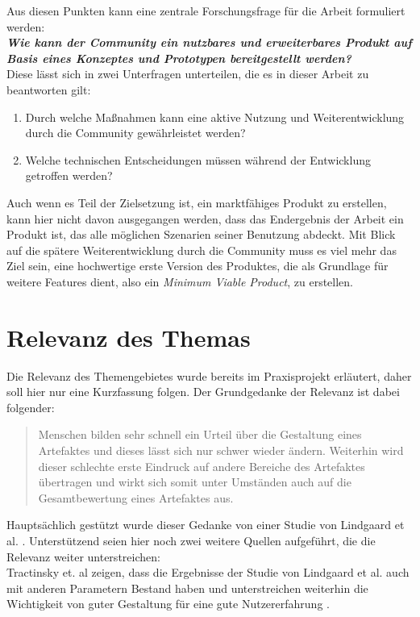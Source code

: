 
Aus diesen Punkten kann eine zentrale Forschungsfrage für die Arbeit formuliert werden:\\

\textit{\textbf{Wie kann der Community ein nutzbares und erweiterbares Produkt auf Basis eines Konzeptes und Prototypen bereitgestellt werden?}}\\

Diese lässt sich in zwei Unterfragen unterteilen, die es in dieser Arbeit zu beantworten gilt:
\begin{enumerate}
  \item Durch welche Maßnahmen kann eine aktive Nutzung und Weiterentwicklung durch die Community gewährleistet werden?
  \item Welche technischen Entscheidungen müssen während der Entwicklung getroffen werden?
\end{enumerate}

Auch wenn es Teil der Zielsetzung ist, ein marktfähiges Produkt zu erstellen, kann hier nicht davon ausgegangen werden, dass das Endergebnis der Arbeit ein Produkt ist, das alle möglichen Szenarien seiner Benutzung abdeckt. Mit Blick auf die spätere Weiterentwicklung durch die Community muss es viel mehr das Ziel sein, eine hochwertige erste Version des Produktes, die als Grundlage für weitere Features dient, also ein \textit{Minimum Viable Product}, zu erstellen.


\section{Relevanz des Themas}
\label{sec:relevance}
Die Relevanz des Themengebietes wurde bereits im Praxisprojekt erläutert, daher soll hier nur eine Kurzfassung folgen. Der Grundgedanke der Relevanz ist dabei folgender:

\begin{quote}
  Menschen bilden sehr schnell ein Urteil über die Gestaltung eines Artefaktes und dieses lässt sich nur schwer wieder ändern. Weiterhin wird dieser schlechte erste Eindruck auf andere Bereiche des Artefaktes übertragen und wirkt sich somit unter Umständen auch auf die Gesamtbewertung eines Artefaktes aus. \cite{PoplawskiPP}
\end{quote}

Hauptsächlich gestützt wurde dieser Gedanke von einer Studie von Lindgaard et al. \cite{lindgaard2006attention}. Unterstützend seien hier noch zwei weitere Quellen aufgeführt, die die Relevanz weiter unterstreichen:\\
Tractinsky et. al zeigen, dass die Ergebnisse der Studie von Lindgaard et al. auch mit anderen Parametern Bestand haben \cite{tractinsky2006evaluating} und unterstreichen weiterhin die Wichtigkeit von guter Gestaltung für eine gute Nutzererfahrung \cite{tractinsky2000beautiful}.

